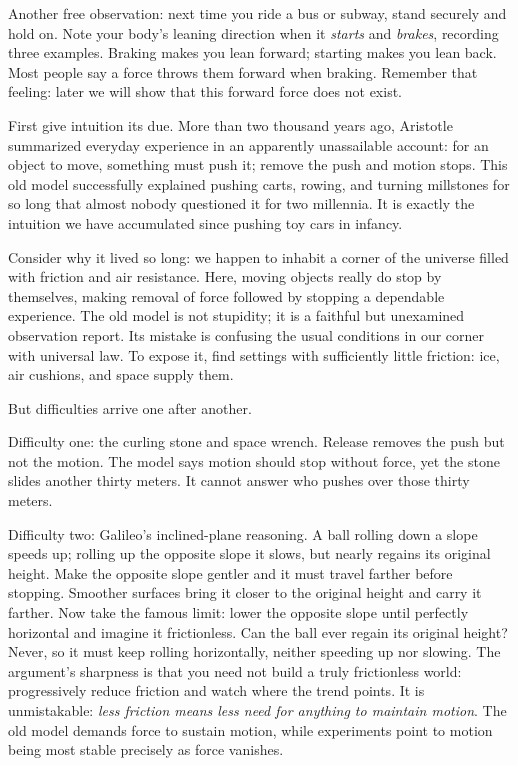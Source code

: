 Another free observation: next time you ride a bus or subway, stand securely and hold on. Note your body's leaning direction when it \emph{starts} and \emph{brakes}, recording three examples. Braking makes you lean forward; starting makes you lean back. Most people say a force throws them forward when braking. Remember that feeling: later we will show that this forward force does not exist.


First give intuition its due. More than two thousand years ago, Aristotle summarized everyday experience in an apparently unassailable account: for an object to move, something must push it; remove the push and motion stops. This old model successfully explained pushing carts, rowing, and turning millstones for so long that almost nobody questioned it for two millennia. It is exactly the intuition we have accumulated since pushing toy cars in infancy.

Consider why it lived so long: we happen to inhabit a corner of the universe filled with friction and air resistance. Here, moving objects really do stop by themselves, making removal of force followed by stopping a dependable experience. The old model is not stupidity; it is a faithful but unexamined observation report. Its mistake is confusing the usual conditions in our corner with universal law. To expose it, find settings with sufficiently little friction: ice, air cushions, and space supply them.

But difficulties arrive one after another.

Difficulty one: the curling stone and space wrench. Release removes the push but not the motion. The model says motion should stop without force, yet the stone slides another thirty meters. It cannot answer who pushes over those thirty meters.

Difficulty two: Galileo's inclined-plane reasoning. A ball rolling down a slope speeds up; rolling up the opposite slope it slows, but nearly regains its original height. Make the opposite slope gentler and it must travel farther before stopping. Smoother surfaces bring it closer to the original height and carry it farther. Now take the famous limit: lower the opposite slope until perfectly horizontal and imagine it frictionless. Can the ball ever regain its original height? Never, so it must keep rolling horizontally, neither speeding up nor slowing. The argument's sharpness is that you need not build a truly frictionless world: progressively reduce friction and watch where the trend points. It is unmistakable: \emph{less friction means less need for anything to maintain motion}. The old model demands force to sustain motion, while experiments point to motion being most stable precisely as force vanishes.

